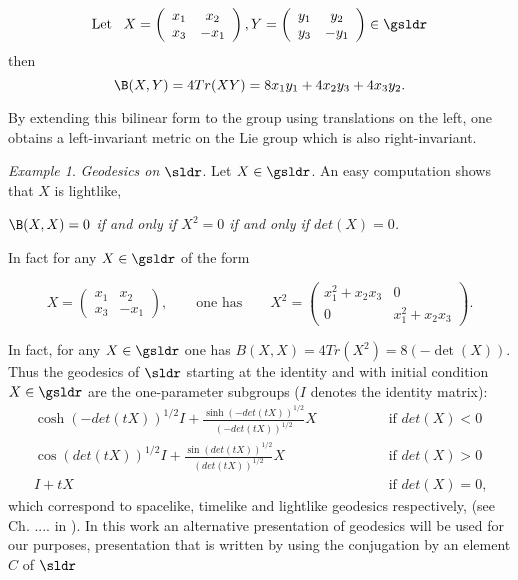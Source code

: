 \documentclass[11pt]{amsart}
\theoremstyle{plain}
\theoremstyle{definition}
\theoremstyle{remark}
\newtheorem{exa}[thm]{Example}
\begin{document}
\begin{equation*} \mbox{Let \,\,\,}
X=\left( \begin{array}{ccc}
x_1 & x_2 \\
x_3 & -x_1 \end{array} \right)
,Y=\left( \begin{array}{ccc}
y_1 & y_2 \\
y_3 & -y_1 \end{array} \right) \in \gsldr
\end{equation*}
then
\begin{equation} \label{killing}
\B(X,Y)=4 Tr(X Y)=8x_1y_1+4x_2y_3+4x_3y_2.
\end{equation}

By extending this bilinear form to the group using translations on the left, one obtains a left-invariant metric on the Lie group which is also right-invariant. 


\begin{exa} \label{example1}{\em Geodesics on  $\sldr$}.  Let $X \in \gsldr$. An easy 
computation shows that  $X$ is lightlike, 

\smallskip

{\em $\B(X,X)=0$ \quad if and 
only if \quad $X^2 =0$ \quad if and only if \quad $det(X)=0$.}

\smallskip

 In fact for any $X\in \gsldr$ of the form

\[
X=\left( \begin{matrix}
x_1 & x_2 \\
x_3 & -x_1 \end{matrix} \right) 
, \qquad \mbox{one has} \qquad X^2=\left( \begin{matrix}
x_1^2+x_2x_3 & 0 \\
0 & x_1^2+x_2x_3 \end{matrix} \right). 
\]
\end{exa}

In fact,  for  any $X\in \gsldr$ one has $B(X,X)=4 Tr(X^2)= 8 (-\det(X))$. 
Thus the geodesics of $\sldr$ starting at the identity and with initial condition $X\in \gsldr$ are the one-parameter subgroups ($I$ denotes the identity matrix):
\begin{eqnarray*}
	\cosh(-det(tX))^{1/2} I + \frac{\sinh(-det(tX))^{1/2}}{(-det(tX))^{1/2}}X  \qquad \qquad & \mbox{ if $det(X)<0$}\\
	\cos(det(tX))^{1/2} I + \frac{\sin(det(tX))^{1/2}}{(det(tX))^{1/2}}X  \qquad \qquad & \mbox{ if $det(X)>0$}\\
	I + tX  \qquad \qquad & \mbox{ if $det(X)=0$,}
\end{eqnarray*}
which correspond to spacelike, timelike and lightlike geodesics respectively, (see Ch. .... in \cite{HEL}). In this work an alternative presentation of geodesics will be used for our purposes, presentation that is written by using the conjugation by an element $C$ of $\sldr$
\end{document}
